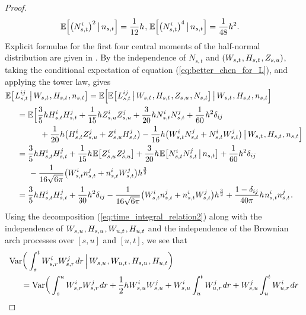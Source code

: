 \documentclass[sn-mathphys-num]{sn-jnl}%
\newcommand{\E}{\mathbb{E}}
\newcommand{\m}{\hspace{0.25mm}}
\newcommand{\mm}{\hspace{5mm}}
\newcommand{\mmm}{\hspace{10mm}}
\newcommand{\var}{\mathrm{Var}}
\begin{document}
\begin{proof}
\begin{align}
\E\Big[\big(N_{s,t}^i\big)^2 \,\big|\, n_{s,t}\Big] & = \frac{1}{12}h\m, &\hspace*{-2.5mm} \E\Big[\big(N_{s,t}^i\big)^4 \,\big|\, n_{s,t}\Big] & = \frac{1}{48}h^2.\label{eq:half_normal_even_moments}
\end{align}
Explicit formulae for the first four central moments of the half-normal distribution are given in \cite[Equation (16)]{elandt1961folded_normal}. By the independence of $N_{s,t}$ and $(W_{s,t}\m, H_{s,t}\m, Z_{s,u})$, taking the conditional expectation of equation (\ref{eq:better_chen_for_L}), and applying the tower law, gives
\begin{align*}
&\\[-20pt]
&\E\big[\m L_{s,t}^{ij}\,\big|\, W_{s,t}\m, H_{s,t}\m, n_{s,t}\big] = \E\Big[\E\big[\m L_{s,t}^{ij}\,\big|\, W_{s,t}\m, H_{s,t}\m, Z_{s,u}\m, N_{s,t}\big]\,\big|\, W_{s,t}\m, H_{s,t}\m, n_{s,t}\Big]\\
&\mm = \E\Big[\m\frac{3}{5}h H_{s,t}^i H_{s,t}^j + \frac{1}{15}h Z_{s,u}^i Z_{s,u}^j + \frac{3}{20}h N_{s,t}^i N_{s,t}^j + \frac{1}{60}\m h^2\delta_{ij}\\
&\hspace{15mm} + \frac{1}{20}h\big(H_{s,t}^i Z_{s,u}^j + Z_{s,u}^i H_{s,t}^j\big) - \frac{1}{16}h\big(W_{s,t}^i N_{s,t}^j + N_{s,t}^i W_{s,t}^j\big)\,\big|\, W_{s,t}\m, H_{s,t}\m, n_{s,t}\Big]\\
&\mm = \frac{3}{5}h H_{s,t}^i H_{s,t}^j + \frac{1}{15}h\m\E\big[Z_{s,u}^i Z_{s,u}^j\big] + \frac{3}{20}h\m\E\big[N_{s,t}^i N_{s,t}^j\,\big|\, n_{s,t}\big] + \frac{1}{60}h^2\delta_{ij}\\
&\mmm - \frac{1}{16\sqrt{6\pi}}\big(W_{s,t}^i n_{s,t}^j + n_{s,t}^i W_{s,t}^j\big)h^\frac{3}{2}\\
&\mm = \frac{3}{5}h H_{s,t}^i H_{s,t}^j + \frac{1}{30}h^2 \delta_{ij} - \frac{1}{16\sqrt{6\pi}}\big(W_{s,t}^i n_{s,t}^j + n_{s,t}^i W_{s,t}^j\big)h^\frac{3}{2} +  \frac{1-\delta_{ij}}{40\pi}h\m n_{s,t}^i n_{s,t}^j\m.
\end{align*}
Using the decomposition (\ref{eq:time_integral_relation2}) along with the independence of $W_{s,u}\m, H_{s,u}\m, W_{u,t}\m, H_{u,t}$ and the independence of the Brownian arch processes over $[s,u]$ and $[u,t]$, we see that
\begin{align*}
&\var\bigg(\int_s^t W_{s,r}^i W_{s,r}^j\m dr \,\Big|\, W_{s,u}\m, W_{u,t}\m, H_{s,u}\m, H_{u,t}\bigg)\\
&\mm = \var\bigg(\int_s^u W_{s,r}^i W_{s,r}^j\m dr + \frac{1}{2}h W_{s,u}^i W_{s,u}^j + W_{s,u}^i\int_u^t W_{u,r}^j\m dr + W_{s,u}^j\int_u^t W_{u,r}^i\m dr\\

\end{align*}
\end{proof}
\end{document}
